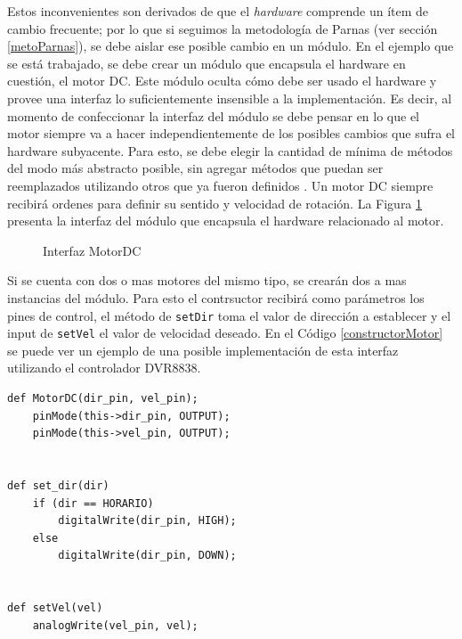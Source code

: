 Estos inconvenientes son derivados de que el \textit{hardware} comprende un ítem de cambio frecuente; por lo que si seguimos la metodología de Parnas (ver sección \ref{metoParnas}), se debe aislar ese posible cambio en un módulo. En el ejemplo que se está trabajado, se debe crear un módulo que encapsula el hardware en cuestión, el motor \gls{DC}. Este módulo oculta cómo debe ser usado el hardware y provee una interfaz lo suficientemente insensible a la implementación. Es decir, al momento de confeccionar la interfaz del módulo se debe pensar en lo que el motor siempre va a hacer independientemente de los posibles cambios que sufra el hardware subyacente. Para esto, se debe elegir la cantidad de mínima de métodos del modo más abstracto posible, sin agregar métodos que puedan ser reemplazados utilizando otros que ya fueron definidos \cite{Parnas02, parnas1977abstract}.
Un motor \gls{DC} siempre recibirá ordenes para definir su sentido y velocidad de rotación. La Figura \ref{interfazMotor} presenta la interfaz del módulo \MotorDC que encapsula el hardware relacionado al motor.

\begin{figure}[H]
\caption{Interfaz MotorDC}
\label{interfazMotor}
\begin{center}
\end{center}
\end{figure}

Si se cuenta con dos o mas motores del mismo tipo, se crearán dos a mas instancias del módulo. Para esto el contrsuctor recibirá como parámetros los pines de control, el método de \verb|setDir| toma el valor de dirección a establecer y el input de \verb|setVel| el valor de velocidad deseado. En el Código \ref{constructorMotor} se puede ver un ejemplo de una posible implementación de esta interfaz utilizando el controlador \gls{DVR8838}.

\begin{lstlisting}[caption=Posible implementación de la interfaz del módulo MotorDC.,label={constructorMotor}]
def MotorDC(dir_pin, vel_pin);
    pinMode(this->dir_pin, OUTPUT);
    pinMode(this->vel_pin, OUTPUT);


def set_dir(dir) 
    if (dir == HORARIO)
        digitalWrite(dir_pin, HIGH);
    else
        digitalWrite(dir_pin, DOWN);
        

def setVel(vel)
    analogWrite(vel_pin, vel);

\end{lstlisting}

